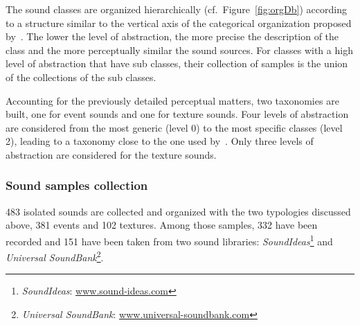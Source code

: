\documentclass[12pt]{elsarticle}
\newcommand{\cf}{cf.}
\begin{document}
The sound classes are organized hierarchically (\cf~Figure~\ref{fig:orgDb}) according to a structure similar to the vertical axis of the categorical organization proposed by~\cite{rosch1978cognition}. The lower the level of abstraction, the more precise the description of the class and the more perceptually similar the sound sources. For classes with a high level of abstraction that have sub classes, their collection of samples is the union of the collections of the sub classes.


Accounting for the previously detailed perceptual matters, two taxonomies are built, one for event sounds and one for texture sounds. Four levels of abstraction are considered from the most generic (level 0) to the most specific classes (level 2), leading to a taxonomy close to the one used by~\cite{Salamon14}. Only three levels of abstraction are considered for the texture sounds.

\subsubsection*{Sound samples collection}


483 isolated sounds are collected and organized with the two typologies discussed above, 381 events and 102 textures. Among those samples, 332 have been recorded and 151 have been taken from two sound libraries: \emph{SoundIdeas}\footnote{\emph{SoundIdeas}: \url{www.sound-ideas.com}} and \emph{Universal SoundBank}\footnote{\emph{Universal SoundBank}: \url{www.universal-soundbank.com}}.
\end{document}
